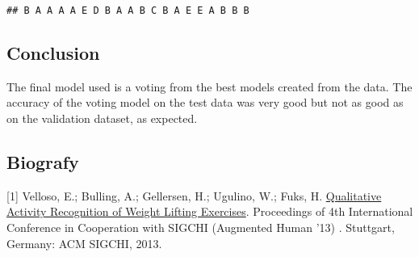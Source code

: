 \documentclass[]{article}
\newenvironment{Shaded}{\begin{snugshade}}{\end{snugshade}}
\newcommand{\KeywordTok}[1]{\textcolor[rgb]{0.13,0.29,0.53}{\textbf{#1}}}
\newcommand{\OperatorTok}[1]{\textcolor[rgb]{0.81,0.36,0.00}{\textbf{#1}}}
\newcommand{\NormalTok}[1]{#1}
\begin{document}
\begin{Shaded}
\end{Shaded}

\begin{verbatim}
## B A A A A E D B A A B C B A E E A B B B
\end{verbatim}

\subsection{Conclusion}\label{conclusion}

The final model used is a voting from the best models created from the
data. The accuracy of the voting model on the test data was very good
but not as good as on the validation dataset, as expected.

\subsection{Biografy}\label{biografy}

{[}1{]} Velloso, E.; Bulling, A.; Gellersen, H.; Ugulino, W.; Fuks, H.
\href{http://groupware.les.inf.puc-rio.br/public/papers/2013.Velloso.QAR-WLE.pdf}{Qualitative
Activity Recognition of Weight Lifting Exercises}. Proceedings of 4th
International Conference in Cooperation with SIGCHI (Augmented Human
'13) . Stuttgart, Germany: ACM SIGCHI, 2013.
\end{document}
